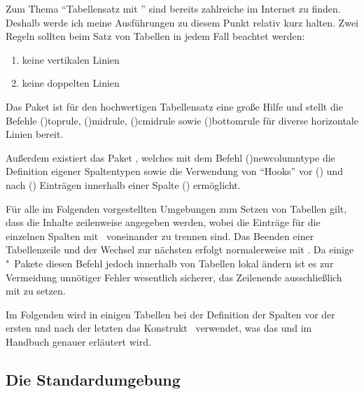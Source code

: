\documentclass[%
  english,ngerman,%
  cdgeometry=no,DIV=12,%
  cd=false,cdfont=false,cdtitle=true,%
  headings=normal,%
  automark,%
  listof=toc,%
]{tudscrartcl}
\begin{document}
Zum Thema \enquote{Tabellensatz mit } sind bereits zahlreiche 
\cite{reichert2012} im Internet zu finden. Deshalb werde ich meine Ausführungen 
zu diesem Punkt relativ kurz halten. Zwei Regeln sollten beim Satz von Tabellen 
in jedem Fall beachtet werden:
%
\begin{enumerate}[%
  itemindent=0pt,noitemsep,%
  labelwidth=*,labelsep=1em,label=\Roman*.%
]
\item keine vertikalen Linien
\item keine doppelten Linien
\end{enumerate}
%
Das Paket  ist für den hochwertigen Tabellensatz eine große 
Hilfe und stellt die Befehle \Macro(){toprule}, 
\Macro(){midrule}, \Macro(){cmidrule} 
sowie \Macro(){bottomrule} für diverse horizontale Linien 
bereit.
%
\begin{Preamble}
\usepackage{booktabs}
\end{Preamble}
%
Außerdem existiert das Paket , welches mit dem Befehl 
\Macro(){newcolumntype} die Definition eigener Spaltentypen 
sowie die Verwendung von \enquote{Hooks} vor (\PValue{>\MPValue{\dots}}) und 
nach (\PValue{<\MPValue{\dots}}) Einträgen innerhalb einer Spalte 
(\PValue{>\MPValue{\dots}}\PValue{<\MPValue{\dots}}) 
ermöglicht.
%
\begin{Preamble}
\usepackage{array}
\end{Preamble}
%
Für alle im Folgenden vorgestellten Umgebungen zum Setzen von Tabellen gilt, 
dass die Inhalte zeilenweise angegeben werden, wobei die Einträge für die 
einzelnen Spalten mit~\PValue{\&} voneinander zu trennen sind. Das Beenden 
einer Tabellenzeile und der Wechsel zur nächsten erfolgt normalerweise mit 
\PValue{\bsc\bsc}. Da einige "~Pakete diesen Befehl jedoch 
innerhalb von Tabellen lokal ändern ist es zur Vermeidung unnötiger Fehler 
wesentlich sicherer, das Zeilenende ausschließlich mit  
zu setzen.

Im Folgenden wird in einigen Tabellen bei der Definition der Spalten vor der 
ersten und nach der letzten das Konstrukt~ verwendet, 
was das  
und im Handbuch genauer erläutert wird. 



\subsection{Die Standardumgebung }
\end{document}
